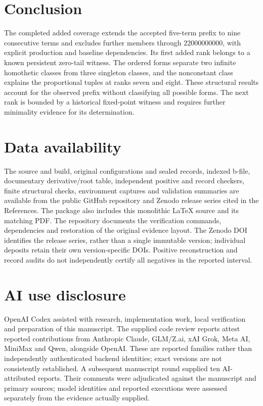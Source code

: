 \documentclass[11pt]{article}
\theoremstyle{definition}
\theoremstyle{remark}
\begin{document}
\section{Conclusion}\label{sec:conclusion}

The completed added coverage extends the accepted five-term
prefix to nine consecutive terms and excludes further members
through $22000000000$, with explicit production and baseline
dependencies. Its first added rank belongs to a known persistent
zero-tail witness. The ordered forms separate two infinite
homothetic classes from three singleton classes, and the
nonconstant class explains the proportional tuples at ranks seven
and eight. These structural results account for the observed
prefix without classifying all possible forms. The next rank is
bounded by a historical fixed-point witness and requires further
minimality evidence for its determination.

\section*{Data availability}

The source and build, original configurations and sealed records,
indexed b-file, documentary derivative/root table, independent
positive and record checkers, finite structural checks, environment
captures and validation summaries are available from the public
GitHub repository and Zenodo release series cited in the References.
The package also includes this monolithic LaTeX source and its
matching PDF. The repository documents the verification commands,
dependencies and restoration of the original evidence layout.
The Zenodo DOI identifies the release series, rather than a single
immutable version; individual deposits retain their own version-specific
DOIs. Positive reconstruction and record audits do not independently
certify all negatives in the reported interval.

\section*{AI use disclosure}

OpenAI Codex assisted with research, implementation work, local
verification and preparation of this manuscript. The supplied code
review reports attest reported contributions from Anthropic Claude,
GLM/Z.ai, xAI Grok, Meta AI, MiniMax and Qwen, alongside OpenAI.
These are reported families rather than independently authenticated
backend identities; exact versions are not consistently established.
A subsequent manuscript round supplied ten AI-attributed reports.
Their comments were adjudicated against the manuscript and primary
sources; model identities and reported executions were assessed
separately from the evidence actually supplied.
\end{document}
